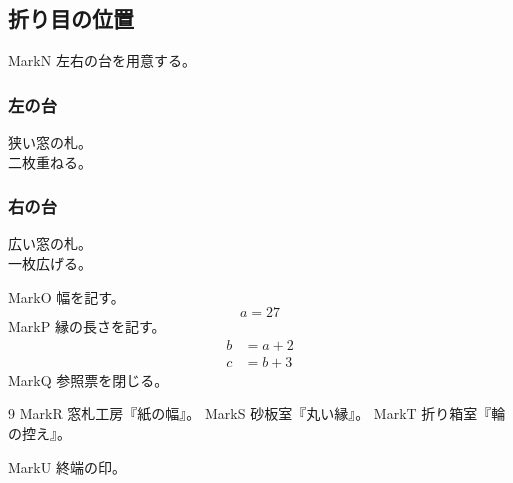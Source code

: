 \documentclass[a4paper,11pt]{ltjsarticle}
\begin{document}
\subsection{折り目の位置}
\noindent MarkN 左右の台を用意する。
\par\noindent\begin{minipage}[t]{.46\linewidth}
\subsubsection*{左の台}狭い窓の札。\\二枚重ねる。
\end{minipage}\hfill
\begin{minipage}[t]{.46\linewidth}
\subsubsection*{右の台}広い窓の札。\\一枚広げる。
\end{minipage}\par
\noindent MarkO 幅を記す。
\[ a = 27 \]
\noindent MarkP 縁の長さを記す。
\begin{align*} b &= a+2 \\ c &= b+3 \end{align*}
\noindent MarkQ 参照票を閉じる。
\begin{thebibliography}{9}
 MarkR 窓札工房『紙の幅』。
 MarkS 砂板室『丸い縁』。
 MarkT 折り箱室『輪の控え』。
\end{thebibliography}
\noindent MarkU 終端の印。
\end{document}
